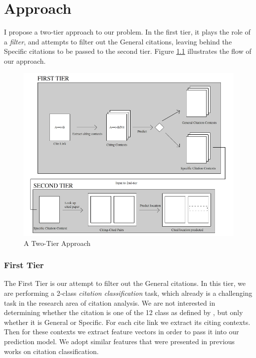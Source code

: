 \chapter{Approach}
\label{twotierapproach}
I propose a two-tier approach to our problem. In the first tier, it plays the role of a \textit{filter}, and attempts to filter out the General citations, leaving behind the Specific citations to be passed to the second tier. Figure \ref{fig:twotier} illustrates the flow of our approach.
\begin{figure}[h]
  \centering
  \includegraphics[scale=0.60]{./twotier}
  \caption{A Two-Tier Approach}
  \label{fig:twotier}
\end{figure}

\subsection{First Tier}
The First Tier is our attempt to filter out the General citations. In this tier, we are performing a 2-class \textit{citation classification} task, which already is a challenging task in the research area of citation analysis. We are not interested in determining whether the citation is one of the 12 class as defined by \cite{teufel2009annotation}, but only whether it is General or Specific. For each cite link we extract its citing contexts. Then for these contexts we extract feature vectors in order to pass it into our prediction model. We adopt similar features that were presented in previous works on citation classification.

